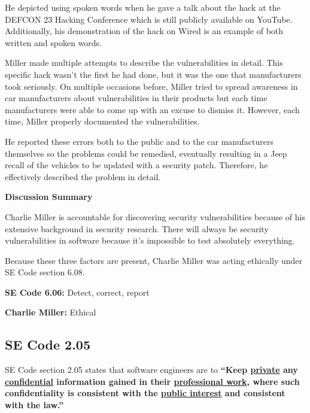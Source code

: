 \documentclass[12pt]{article}
\begin{document}
\begin{multicols}{2}
He depicted using spoken words when he gave a talk about the hack at the DEFCON 23 Hacking Conference which is still publicly available on YouTube. \cite{youtube} Additionally, his demonstration of the hack on Wired is an example of both written and spoken words.\cite{wired}

Miller made multiple attempts to describe the vulnerabilities in detail. This specific hack wasn't the first he had done, but it was the one that manufacturers took seriously. \cite{recall} On multiple occasions before, Miller tried to spread awareness in car manufacturers about vulnerabilities in their products but each time manufacturers were able to come up with an excuse to dismiss it.\cite {officialPaper} However, each time, Miller properly documented the vulnerabilities.

He reported these errors both to the public and to the car manufacturers themselves so the problems could be remedied, eventually resulting in a Jeep recall of the vehicles to be updated with a security patch.\cite{recall} Therefore, he effectively described the problem in detail.

\vspace{.5cm}\hspace{-.5cm}\textbf{Discussion Summary}\vspace{.2cm}

Charlie Miller is accountable for discovering security vulnerabilities because of his extensive background in security research.\cite{linkedin} There will always be security vulnerabilities in software because it's impossible to test absolutely everything. \cite{turner} 

Because these three factors are present, Charlie Miller was acting ethically under SE Code section 6.08.

\begin{framed}
\hspace{-.67cm}\textbf{SE Code 6.06:} Detect, correct, report 

\hspace{-.67cm}\textbf{Charlie Miller:} Ethical
\end{framed}


\subsection{SE Code 2.05}

SE Code section 2.05 states that software engineers are to \textbf{``Keep \underline{private} any \underline{confidential} information gained in their \underline{professional work}, where such confidentiality is consistent with the \underline{public interest} and consistent with the law.''}\cite{seCode}


\end{multicols}
\end{document}
